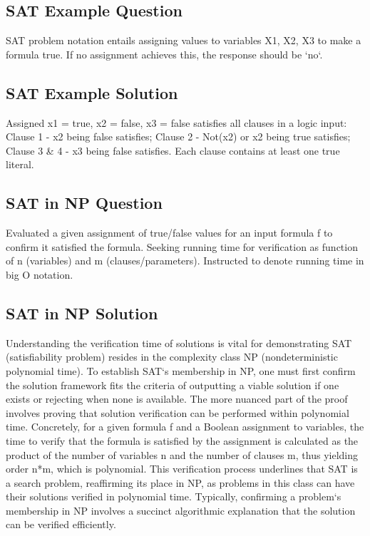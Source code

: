 \subsection*{SAT Example Question}
SAT problem notation entails assigning values to variables X1, X2, X3 to make a formula true.
If no assignment achieves this, the response should be `no`.

\subsection*{SAT Example Solution}
Assigned x1 = true, x2 = false, x3 = false satisfies all clauses in a logic input: Clause 1 - x2 being false satisfies; Clause 2 - Not(x2) or x2 being true satisfies; Clause 3 \& 4 - x3 being false satisfies.
Each clause contains at least one true literal.

\subsection*{SAT in NP Question}
Evaluated a given assignment of true/false values for an input formula f to confirm it satisfied the formula.
Seeking running time for verification as function of n (variables) and m (clauses/parameters).
Instructed to denote running time in big O notation.

\subsection*{SAT in NP Solution}
Understanding the verification time of solutions is vital for demonstrating SAT (satisfiability problem) resides in the complexity class NP (nondeterministic polynomial time).
To establish SAT`s membership in NP, one must first confirm the solution framework fits the criteria of outputting a viable solution if one exists or rejecting when none is available.
The more nuanced part of the proof involves proving that solution verification can be performed within polynomial time.
Concretely, for a given formula f and a Boolean assignment to variables, the time to verify that the formula is satisfied by the assignment is calculated as the product of the number of variables n and the number of clauses m, thus yielding order n*m, which is polynomial.
This verification process underlines that SAT is a search problem, reaffirming its place in NP, as problems in this class can have their solutions verified in polynomial time.
Typically, confirming a problem`s membership in NP involves a succinct algorithmic explanation that the solution can be verified efficiently.

